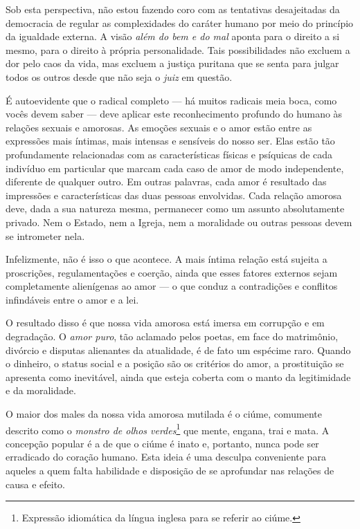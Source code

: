 Sob esta perspectiva, não estou fazendo coro com as tentativas desajeitadas da
democracia de regular as complexidades do caráter humano por meio do
princípio da igualdade externa. A visão \textit{além do bem e do mal} aponta
para o direito a si mesmo, para o direito à própria personalidade. Tais
possibilidades não excluem a dor pelo caos da vida, mas excluem a
justiça puritana que se senta para julgar todos os outros desde que não
seja o \textit{juiz} em questão.

É autoevidente que o radical completo --- há muitos radicais meia boca, \label{radical}
como vocês devem saber --- deve aplicar este reconhecimento profundo do
humano às relações sexuais e amorosas. As emoções sexuais e o amor estão
entre as expressões mais íntimas, mais intensas e sensíveis do nosso
ser. Elas estão tão profundamente relacionadas com as características
físicas e psíquicas de cada indivíduo em particular que marcam cada caso
de amor de modo independente, diferente de qualquer outro. Em outras
palavras, cada amor é resultado das impressões e características das
duas pessoas envolvidas. Cada relação amorosa deve, dada a sua natureza
mesma, permanecer como um assunto absolutamente privado. Nem o Estado,
nem a Igreja, nem a moralidade ou outras pessoas devem se intrometer nela.

Infelizmente, não é isso o que acontece. A mais íntima relação está
sujeita a proscrições, regulamentações e coerção, ainda que esses
fatores externos sejam completamente alienígenas ao amor --- o que conduz
a contradições e conflitos infindáveis entre o amor e a lei.

O resultado disso é que nossa vida amorosa está imersa em corrupção e em
degradação. O \textit{amor puro}, tão aclamado pelos poetas, em face do
matrimônio, divórcio e disputas alienantes da atualidade, é de fato um
espécime raro. Quando o dinheiro, o status social e a posição são os
critérios do amor, a prostituição se apresenta como inevitável, ainda
que esteja coberta com o manto da legitimidade e da moralidade.

O maior dos males da nossa vida amorosa mutilada é o ciúme, comumente
descrito como o \textit{monstro de olhos verdes}\footnote{Expressão
  idiomática da língua inglesa para se referir ao ciúme.} que mente,
engana, trai e mata. A concepção popular é a de que o ciúme é inato e,
portanto, nunca pode ser erradicado do coração humano. Esta ideia é uma
desculpa conveniente para aqueles a quem falta habilidade e disposição
de se aprofundar nas relações de causa e efeito.

